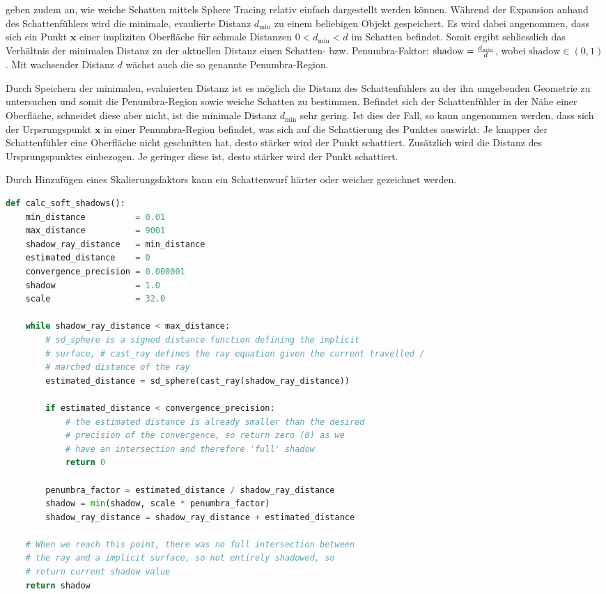 \citeauthor{reiner_smi_2011} geben zudem an, wie weiche Schatten mittels
Sphere Tracing relativ einfach dargestellt werden können. Während der
Expansion anhand des Schattenfühlers wird die minimale, evaulierte
Distanz $d_{\text{min}}$ zu einem beliebigen Objekt gespeichert. Es wird
dabei angenommen, dass sich ein Punkt $\bm{x}$ einer impliziten
Oberfläche für schmale Distanzen $ 0 < d_{\text{min}} < d $ im Schatten
befindet. Somit ergibt schliesslich das Verhältnis der minimalen Distanz
zu der aktuellen Distanz einen Schatten- bzw.  Penumbra-Faktor:
$\text{shadow} = {d_{\text{min}} \over d}$, wobei $\text{shadow} \in (0,
1)$. Mit wachsender Distanz $d$ wächst auch die so genannte
Penumbra-Region.

Durch Speichern der minimalen, evaluierten Distanz ist es möglich die
Distanz des Schattenfühlers zu der ihn umgebenden Geometrie zu
untersuchen und somit die Penumbra-Region sowie weiche Schatten zu
bestimmen. Befindet sich der Schattenfühler in der Nähe einer
Oberfläche, schneidet diese aber nicht, ist die minimale Distanz
$d_{\text{min}}$ sehr gering. Ist dies der Fall, so kann angenommen
werden, dass sich der Urpsrungspunkt $\bm{x}$ in einer Penumbra-Region
befindet, was sich auf die Schattierung des Punktes auswirkt: Je
knapper der Schattenfühler eine Oberfläche nicht geschnitten hat, desto
stärker wird der Punkt schattiert. Zusätzlich wird die Distanz des
Ursprungspunktes einbezogen. Je geringer diese ist, desto stärker wird
der Punkt schattiert.

Durch Hinzufügen eines Skalierungsfaktors kann ein Schattenwurf härter
oder weicher gezeichnet werden.

\begin{lstlisting}[language=Python,caption={Algorithmus zur Berechnung
        von weichen Schatten.},label={alg:sphere_tracing_soft_shadows},captionpos=b,emph={calc_soft_shadows}]
def calc_soft_shadows():
    min_distance          = 0.01
    max_distance          = 9001
    shadow_ray_distance   = min_distance
    estimated_distance    = 0
    convergence_precision = 0.000001
    shadow                = 1.0
    scale                 = 32.0

    while shadow_ray_distance < max_distance:
        # sd_sphere is a signed distance function defining the implicit
        # surface, # cast_ray defines the ray equation given the current travelled /
        # marched distance of the ray
        estimated_distance = sd_sphere(cast_ray(shadow_ray_distance))

        if estimated_distance < convergence_precision:
            # the estimated distance is already smaller than the desired
            # precision of the convergence, so return zero (0) as we
            # have an intersection and therefore 'full' shadow
            return 0

        penumbra_factor = estimated_distance / shadow_ray_distance
        shadow = min(shadow, scale * penumbra_factor)
        shadow_ray_distance = shadow_ray_distance + estimated_distance

    # When we reach this point, there was no full intersection between
    # the ray and a implicit surface, so not entirely shadowed, so
    # return current shadow value
    return shadow
\end{lstlisting}
